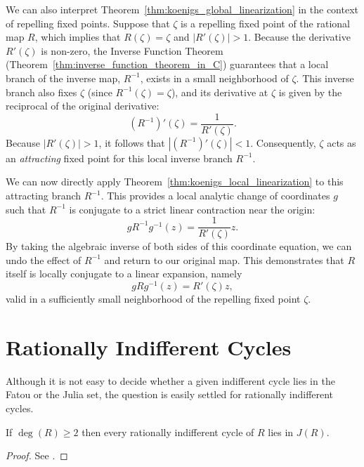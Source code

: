 We can also interpret Theorem~\ref{thm:koenigs_global_linearization} in the
context of repelling fixed points. Suppose that $\zeta$ is a repelling fixed
point of the rational map $R$, which implies that $R(\zeta) = \zeta$ and
$|R'(\zeta)| > 1$. Because the derivative $R'(\zeta)$ is non-zero, the Inverse
Function Theorem (Theorem~\ref{thm:inverse_function_theorem_in_C}) guarantees
that a local branch of the inverse map, $R^{-1}$, exists in a small neighborhood
of $\zeta$. This inverse branch also fixes $\zeta$ (since $R^{-1}(\zeta) =
\zeta$), and its derivative at $\zeta$ is given by the reciprocal of the
original derivative:
\begin{equation*}
    (R^{-1})'(\zeta) = \frac{1}{R'(\zeta)}.
\end{equation*}
Because $|R'(\zeta)| > 1$, it follows that $|(R^{-1})'(\zeta)| < 1$.
Consequently, $\zeta$ acts as an \emph{attracting} fixed point for this local
inverse branch $R^{-1}$. 

We can now directly apply Theorem~\ref{thm:koenigs_local_linearization} to this
attracting branch $R^{-1}$. This provides a local analytic change of coordinates
$g$ such that $R^{-1}$ is conjugate to a strict linear contraction near the
origin:
\begin{equation*}
    g R^{-1} g^{-1}(z) = \frac{1}{R'(\zeta)} z.
\end{equation*}
By taking the algebraic inverse of both sides of this coordinate equation, we
can undo the effect of $R^{-1}$ and return to our original map. This
demonstrates that $R$ itself is locally conjugate to a linear expansion, namely
\begin{equation*}
    g R g^{-1}(z) = R'(\zeta) z,
\end{equation*}
valid in a sufficiently small neighborhood of the repelling fixed point $\zeta$.

\section{Rationally Indifferent Cycles}
\label{sec:rationally_indifferent_cycles}

Although it is not easy to decide whether a given indifferent cycle lies in the
Fatou or the Julia set, the question is easily settled for rationally
indifferent cycles.

\begin{theorem}
    If $\deg(R) \geq 2$ then every rationally indifferent cycle of $R$ lies in
    $J(R)$.
\end{theorem}
\begin{proof}
    See \cite[111]{Beardon1991}.
\end{proof}

